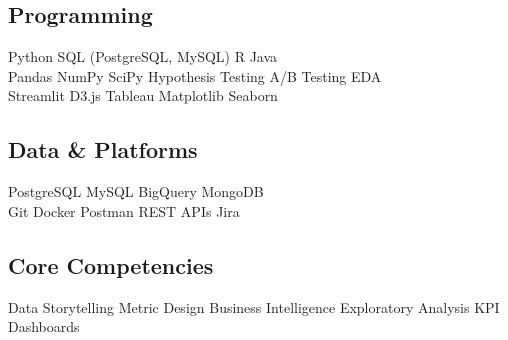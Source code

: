 \documentclass[../main.tex]{subfiles}
\begin{document}
\subsection{Programming}
Python \textbullet{} SQL (PostgreSQL, MySQL) \textbullet{} R \textbullet{} Java \\
Pandas \textbullet{} NumPy \textbullet{} SciPy \textbullet{} Hypothesis Testing \textbullet{} A/B Testing \textbullet{} EDA \\
Streamlit \textbullet{} D3.js \textbullet{} Tableau \textbullet{} Matplotlib \textbullet{} Seaborn \\

\subsection{Data \& Platforms}
PostgreSQL \textbullet{} MySQL \textbullet{} BigQuery \textbullet{} MongoDB \\
Git \textbullet{} Docker \textbullet{} Postman \textbullet{} REST APIs \textbullet{} Jira \\

\subsection{Core Competencies}
Data Storytelling \textbullet{} Metric Design \textbullet{} Business Intelligence \textbullet{} Exploratory Analysis \textbullet{} KPI Dashboards
\end{document}
